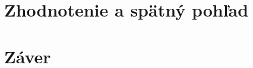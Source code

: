\documentclass[10pt,twoside,a4paper]{article}
\begin{document}
\section{Zhodnotenie a spätný pohľad} \label{konec}




\section{Záver} \label{zaver} %






\end{document}

